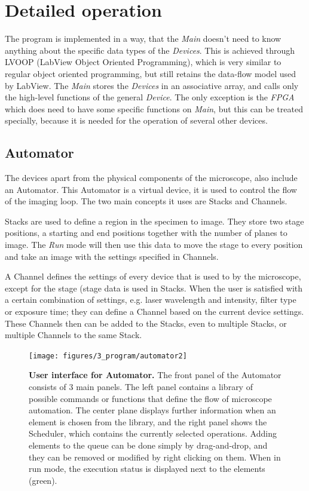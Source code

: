 \documentclass{tdk_style}
\begin{document}
\section{Detailed operation}
The program is implemented in a way, that the \emph{Main} doesn't need to know anything about the specific data types of the \emph{Devices}. This is achieved through LVOOP (LabView Object Oriented Programming), which is very similar to regular object oriented programming, but still retains the data-flow model used by LabView. The \emph{Main} stores the \emph{Devices} in an associative array, and calls only the high-level functions of the general \emph{Device}. The only exception is the \emph{FPGA} which does need to have some specific functions on \emph{Main}, but this can be treated specially, because it is needed for the operation of several other devices. 

\subsection{Automator}
\label{automator}
The devices apart from the physical components of the microscope, also include an Automator. This Automator is a virtual device, it is used to control the flow of the imaging loop. The two main concepts it uses are Stacks and Channels.

Stacks are used to define a region in the specimen to image. They store two stage positions, a starting and end positions together with the number of planes to image. The \emph{Run} mode will then use this data to move the stage to every position and take an image with the settings specified in Channels.

A Channel defines the settings of every device that is used to by the microscope, except for the stage (stage data is used in Stacks. When the user is satisfied with a certain combination of settings, e.g. laser wavelength and intensity, filter type or exposure time; they can define a Channel based on the current device settings. These Channels then can be added to the Stacks, even to multiple Stacks, or multiple Channels to the same Stack.

\begin{figure}[htbp]
	\centering
	\texttt{[image: figures/3\_program/automator2]}
	\caption{\textbf{User interface for Automator.} The front panel of the Automator consists of 3 main panels. The left panel contains a library of possible commands or functions that define the flow of microscope automation. The center plane displays further information when an element is chosen from the library, and the right panel shows the Scheduler, which contains the currently selected operations. Adding elements to the queue can be done simply by drag-and-drop, and they can be removed or modified by right clicking on them. When in run mode, the execution status is displayed next to the elements (green).}
	\label{fig:ui_automator}
\end{figure}
\end{document}

